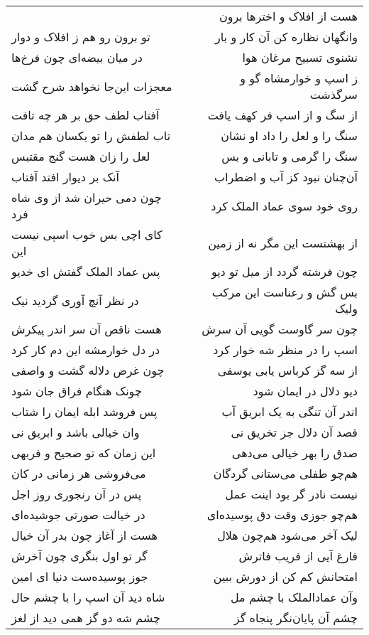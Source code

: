 \begin{center}
\begin{longtable}{l p{0.5cm} r}
&&
هست از افلاک و اخترها برون
\\
تو برون رو هم ز افلاک و دوار
&&
وانگهان نظاره کن آن کار و بار
\\
در میان بیضه‌ای چون فرخ‌ها
&&
نشنوی تسبیح مرغان هوا
\\
معجزات این‌جا نخواهد شرح گشت
&&
ز اسپ و خوارمشاه گو و سرگذشت
\\
آفتاب لطف حق بر هر چه تافت
&&
از سگ و از اسپ فر کهف یافت
\\
تاب لطفش را تو یکسان هم مدان
&&
سنگ را و لعل را داد او نشان
\\
لعل را زان هست گنج مقتبس
&&
سنگ را گرمی و تابانی و بس
\\
آنک بر دیوار افتد آفتاب
&&
آن‌چنان نبود کز آب و اضطراب
\\
چون دمی حیران شد از وی شاه فرد
&&
روی خود سوی عماد الملک کرد
\\
کای اچی بس خوب اسپی نیست این
&&
از بهشتست این مگر نه از زمین
\\
پس عماد الملک گفتش ای خدیو
&&
چون فرشته گردد از میل تو دیو
\\
در نظر آنچ آوری گردید نیک
&&
بس گش و رعناست این مرکب ولیک
\\
هست ناقص آن سر اندر پیکرش
&&
چون سر گاوست گویی آن سرش
\\
در دل خوارمشه این دم کار کرد
&&
اسپ را در منظر شه خوار کرد
\\
چون غرض دلاله گشت و واصفی
&&
از سه گز کرباس یابی یوسفی
\\
چونک هنگام فراق جان شود
&&
دیو دلال در ایمان شود
\\
پس فروشد ابله ایمان را شتاب
&&
اندر آن تنگی به یک ابریق آب
\\
وان خیالی باشد و ابریق نی
&&
قصد آن دلال جز تخریق نی
\\
این زمان که تو صحیح و فربهی
&&
صدق را بهر خیالی می‌دهی
\\
می‌فروشی هر زمانی در کان
&&
هم‌چو طفلی می‌ستانی گردگان
\\
پس در آن رنجوری روز اجل
&&
نیست نادر گر بود اینت عمل
\\
در خیالت صورتی جوشیده‌ای
&&
هم‌چو جوزی وقت دق پوسیده‌ای
\\
هست از آغاز چون بدر آن خیال
&&
لیک آخر می‌شود هم‌چون هلال
\\
گر تو اول بنگری چون آخرش
&&
فارغ آیی از فریب فاترش
\\
جوز پوسیده‌ست دنیا ای امین
&&
امتحانش کم کن از دورش ببین
\\
شاه دید آن اسپ را با چشم حال
&&
وآن عمادالملک با چشم مل
\\
چشم شه دو گز همی دید از لغز
&&
چشم آن پایان‌نگر پنجاه گز

\end{longtable}
\end{center}
